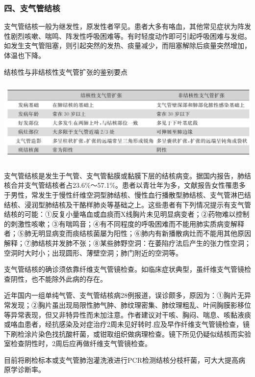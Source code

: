 \subsubsection{四、支气管结核}

支气管结核一般为继发性，原发性者罕见。患者大多有咯血，其他常见症状为阵发性剧烈咳嗽、喘鸣、阵发性呼吸困难等。有时轻度动作即可引起呼吸困难与发绀。如发生支气管阻塞，则引起突然的发热、痰量减少，而阻塞解除后痰量突然增加，体温也下降。

\begin{table}[htbp]
\centering
\caption{结核性与非结核性支气管扩张的鉴别要点}
\label{tab4-4}
\includegraphics[width=5.94792in,height=1.65625in]{./images/Image00041.jpg}
\end{table}

支气管结核是发生于气管、支气管黏膜或黏膜下层的结核病变。据国内报告，肺结核合并支气管结核者占23.6\%～57.1\%。患者以青壮年为多，文献报告女性罹患多于男性，常发生于慢性纤维空洞型肺结核、慢性血行播散型肺结核、支气管淋巴结结核、浸润型肺结核及干酪样肺炎等基础之上。这些患者有下列情况提示有支气管结核的可能：①反复小量咯血或血痰而X线胸片未见明显病变者；②药物难以控制的刺激性咳嗽；③有喘鸣音；④有不同程度的呼吸困难而不能用肺实质病变解释者；⑤肺无明显病变而痰结核菌屡为阳性；⑥肺内有新播散病灶而不能用其他原因解释；⑦肺结核并发肺不张；⑧某些肺野空洞：在萎陷疗法后产生的张力性空洞；空洞时大时小；出现圆形、薄壁空洞；肺门附近的空洞等。

支气管结核的确诊须依靠纤维支气管镜检查。如临床症状典型，虽纤维支气管镜检查阴性，也不能除外此病的存在。

近年国内一组单纯气管、支气管结核病28例报道，误诊颇多，原因为：①胸片无异常发现；②胸片虽出现局限性肺气肿、肺纹理密集、肺纹理粗乱、叶间胸膜影移位等异常表现，但又非特异性而未加注意。作者建议对干咳、胸闷、喘息、咳黏液痰或咯血患者，经抗感染及对症治疗2周未见好转时.应及早作纤维支气管镜检查，镜下刷检涂片染色找抗酸杆菌，或钳取组织做病理检查。镜下所见仍疑似结核而实验室检查阴性时，2周后应再做纤维支气管镜检查。

目前将刷检标本或支气管肺泡灌洗液进行PCR检测结核分枝杆菌，可大大提高病原学诊断率。

